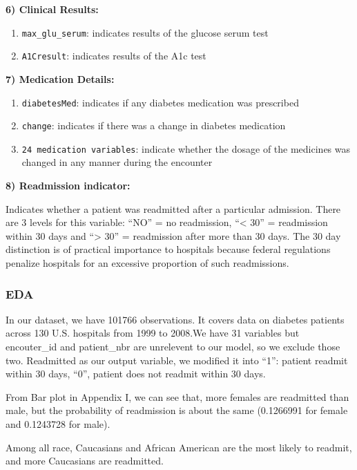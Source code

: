 \documentclass[]{article}
\providecommand{\tightlist}{%
  \setlength{\itemsep}{0pt}\setlength{\parskip}{0pt}}
\begin{document}
\textbf{6) Clinical Results:}

\begin{enumerate}
\def\labelenumi{\alph{enumi}.}
\tightlist
\item
  \texttt{max\_glu\_serum}: indicates results of the glucose serum test
\item
  \texttt{A1Cresult}: indicates results of the A1c test
\end{enumerate}

\textbf{7) Medication Details:}

\begin{enumerate}
\def\labelenumi{\alph{enumi}.}
\tightlist
\item
  \texttt{diabetesMed}: indicates if any diabetes medication was
  prescribed
\item
  \texttt{change}: indicates if there was a change in diabetes
  medication
\item
  \texttt{24\ medication\ variables}: indicate whether the dosage of the
  medicines was changed in any manner during the encounter
\end{enumerate}

\textbf{8) Readmission indicator:}

Indicates whether a patient was readmitted after a particular admission.
There are 3 levels for this variable: ``NO'' = no readmission,
``\textless{} 30'' = readmission within 30 days and ``\textgreater{}
30'' = readmission after more than 30 days. The 30 day distinction is of
practical importance to hospitals because federal regulations penalize
hospitals for an excessive proportion of such readmissions.

\subsubsection{EDA}\label{eda}

In our dataset, we have 101766 observations. It covers data on diabetes
patients across 130 U.S. hospitals from 1999 to 2008.We have 31
variables but encouter\_id and patient\_nbr are unrelevent to our model,
so we exclude those two. Readmitted as our output variable, we modified
it into ``1'': patient readmit within 30 days, ``0'', patient does not
readmit within 30 days.

From Bar plot in Appendix I, we can see that, more females are
readmitted than male, but the probability of readmission is about the
same (0.1266991 for female and 0.1243728 for male).

Among all race, Caucasians and African American are the most likely to
readmit, and more Caucasians are readmitted.
\end{document}
